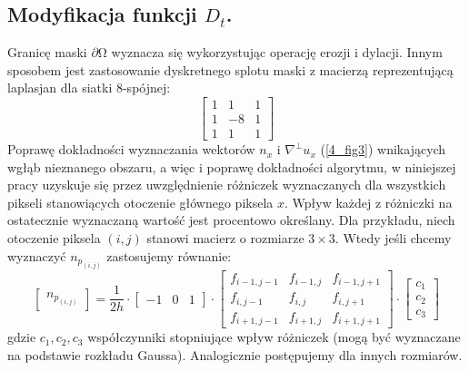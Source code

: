 \documentclass[12pt, twoside, openany]{report}
\theoremstyle{definition}
\begin{document}
\subsection{Modyfikacja funkcji $D_t$.}
Granicę maski $\partial \mathrm{\Omega }$ wyznacza się wykorzystując operację erozji i dylacji. Innym sposobem jest zastosowanie dyskretnego splotu maski z macierzą reprezentującą laplasjan dla siatki 8-spójnej: 
\begin{equation}
\left[ \begin{array}{ccc}
1 & 1 & 1 \\ 
1 & -8 & 1 \\ 
1 & 1 & 1 \end{array}
\right]
\label{LAPLASJAN}
\end{equation}
Poprawę dokładności wyznaczania wektorów $n_x$ i $\nabla^\bot u_x$ (\autoref{4_fig3}) wnikających wgłąb nieznanego obszaru, a więc i poprawę dokładności algorytmu, w niniejszej pracy uzyskuje się przez uwzględnienie różniczek wyznaczanych dla wszystkich pikseli stanowiących otoczenie głównego piksela $x$. Wpływ każdej z różniczki na ostatecznie wyznaczaną wartość jest procentowo określany.
Dla przykładu, niech otoczenie piksela $(i, j)$ stanowi macierz o rozmiarze $3 \times 3$. Wtedy jeśli chcemy wyznaczyć $n_{p_{(i,j)}}$ zastosujemy równanie:
\[
\begin{bmatrix}
n_{p_{(i,j)}}
\end{bmatrix}
=\frac{1}{2h}
\cdot
\begin{bmatrix}
-1 & 0 & 1
\end{bmatrix}
\cdot
\begin{bmatrix}
f_{i-1, j-1} & f_{i-1, j} & f_{i-1, j+1}\\ 
f_{i,   j-1} & f_{i,   j} & f_{i,   j+1}\\
f_{i+1, j-1} & f_{i+1, j} & f_{i+1, j+1}
\end{bmatrix}
\cdot
\begin{bmatrix}
c_1\\ 
c_2\\
c_3
\end{bmatrix}
\]
gdzie $c_1, c_2, c_3$ współczynniki stopniujące wpływ różniczek (mogą być wyznaczane na podstawie rozkładu Gaussa). Analogicznie postępujemy dla innych rozmiarów.
\end{document}
